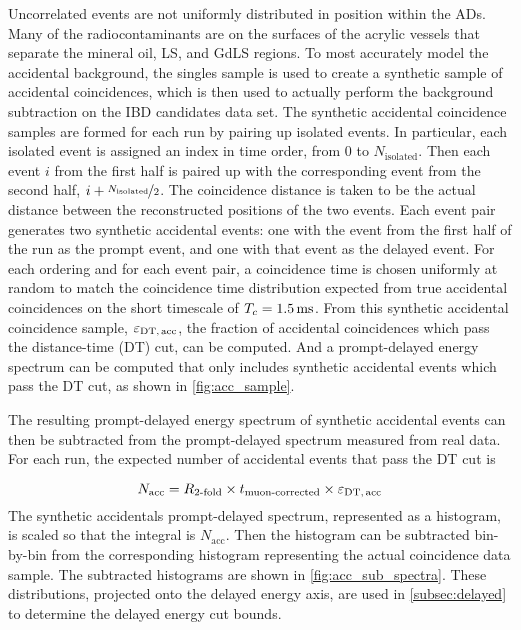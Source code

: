 Uncorrelated events are not uniformly distributed
in position within the ADs.
Many of the radiocontaminants are on the surfaces of the
acrylic vessels that separate the mineral oil, LS, and GdLS regions.
To most accurately model the accidental background,
the singles sample is used to create a synthetic sample of accidental coincidences,
which is then used to actually perform the background subtraction
on the IBD candidates data set.
The synthetic accidental coincidence samples are formed for each run
by pairing up isolated events.
In particular, each isolated event is assigned an index in time order,
from $0$ to $N_{\text{isolated}}$.
Then each event $i$ from the first half is paired up with
the corresponding event from the second half, $i + \nicefrac{N_{\text{isolated}}}{2}$.
The coincidence distance is taken to be the actual distance
between the reconstructed positions of the two events.
Each event pair generates two synthetic accidental events:
one with the event from the first half of the run as the prompt event,
and one with that event as the delayed event.
For each ordering and for each event pair, a coincidence time is chosen
uniformly at random to match the coincidence time distribution
expected from true accidental coincidences on the short timescale
of $T_c=\SI{1.5}{\milli\second}$.
From this synthetic accidental coincidence sample, $\varepsilon_{\text{DT,\,acc}}$,
the fraction of accidental  coincidences which pass the distance-time (DT) cut,
can be computed.
And a prompt-delayed energy spectrum can be computed that only includes
synthetic accidental events which pass the DT cut,
as shown in \cref{fig:acc_sample}.

The resulting prompt-delayed energy spectrum of synthetic accidental events
can then be subtracted
from the prompt-delayed spectrum measured from real data.
For each run, the expected number of accidental events that pass the DT cut is

\begin{equation}
    N_{\text{acc}} = R_{\text{\ensuremath{2}-fold}} \times t_{\text{muon-corrected}}
        \times \varepsilon_{\text{DT,\,acc}}
    \label{eq:nacc}
\end{equation}
The synthetic accidentals prompt-delayed spectrum, represented as a histogram,
is scaled so that the integral is $N_{\text{acc}}$.
Then the histogram can be subtracted bin-by-bin from the corresponding histogram
representing the actual  coincidence data sample.
The subtracted histograms are shown in \cref{fig:acc_sub_spectra}.
These distributions, projected onto the delayed energy axis,
are used in \cref{subsec:delayed} to determine the delayed energy cut bounds.

